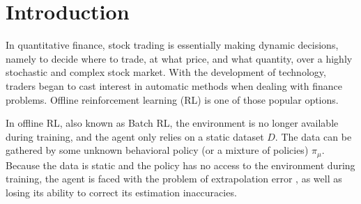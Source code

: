\documentclass[nohyperref]{article}
\theoremstyle{plain}
\theoremstyle{definition}
\theoremstyle{remark}
\begin{document}

\begin{abstract}


Offline reinforcement learning (RL), also known as batch RL, offers the prospect of policy optimization from large pre-recorded datasets without online environment interaction. Based on NeoRL benchmark \cite{2102.00714}, we apply a novel offline RL algorithm to learn policies from stock data using a form of \textbf{c}ritic-\textbf{r}egularized \textbf{r}egression, named CRR \cite{2006.15134}. Considering the finance setting, we provide the agent not only the current observation but also historical data (thus it is called ``\textbf{CRR with Past}"), and find out that this feature is quite essential in improving the performance. What's more, we compare several variants of CRR and discuss the choice of different weight functions.

\end{abstract}

\section{Introduction}
\label{submission}

In quantitative finance, stock trading is essentially making dynamic decisions, namely to decide where to trade, at what price, and what quantity, over a highly stochastic and complex stock market. With the development of technology, traders began to cast interest in automatic methods when dealing with finance problems. Offline reinforcement learning (RL) is one of those popular options. 

In offline RL, also known as Batch RL, the environment is no longer available during training, and the agent only relies on a static dataset $D$. The data can be gathered by some unknown behavioral policy (or a mixture of policies) $\pi_\mu$. Because the data is static and the policy has no access to the environment during training, the agent is faced with the problem of extrapolation error \cite{kidambi2020morel}, as well as losing its ability to correct its estimation inaccuracies.
\end{document}
